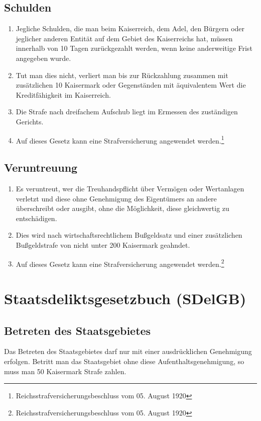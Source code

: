 \documentclass{article}
\begin{document}
\subsection{Schulden}
\begin{enumerate}[(1)]
    \item Jegliche Schulden, die man beim Kaiserreich, dem Adel, den Bürgern oder jeglicher anderen Entität auf dem Gebiet des Kaiserreichs hat, müssen innerhalb von 10 Tagen zurückgezahlt werden, wenn keine anderweitige Frist angegeben wurde.
    \item Tut man dies nicht, verliert man bis zur Rückzahlung zusammen mit zusätzlichen 10 Kaisermark oder Gegenständen mit äquivalentem Wert die Kreditfähigkeit im Kaiserreich.
    \item Die Strafe nach dreifachem Aufschub liegt im Ermessen des zuständigen Gerichts.
    \item Auf dieses Gesetz kann eine Strafversicherung angewendet werden.\footnote{Reichsstrafversicherungsbeschluss vom 05. August 1920}    
\end{enumerate}

\subsection{Veruntreuung}
\begin{enumerate}[(1)]
    \item Es veruntreut, wer die Treuhandspflicht über Vermögen oder Wertanlagen verletzt und diese ohne Genehmigung des Eigentümers an andere überschreibt oder ausgibt, ohne die Möglichkeit, diese gleichwertig zu entschädigen.
    \item Dies wird nach wirtschaftsrechtlichem Bußgeldsatz und einer zusätzlichen Bußgeldstrafe von nicht unter 200 Kaisermark geahndet.
    \item Auf dieses Gesetz kann eine Strafversicherung angewendet werden.\footnote{Reichsstrafversicherungsbeschluss vom 05. August 1920}
\end{enumerate}

\newpage
\section{Staatsdeliktsgesetzbuch (SDelGB)}
\localtableofcontents

\subsection{Betreten des Staatsgebietes}
Das Betreten des Staatsgebietes darf nur mit einer ausdrücklichen Genehmigung erfolgen. Betritt man das Staatsgebiet ohne diese Aufenthaltsgenehmigung, so muss man 50 Kaisermark Strafe zahlen.
\end{document}
